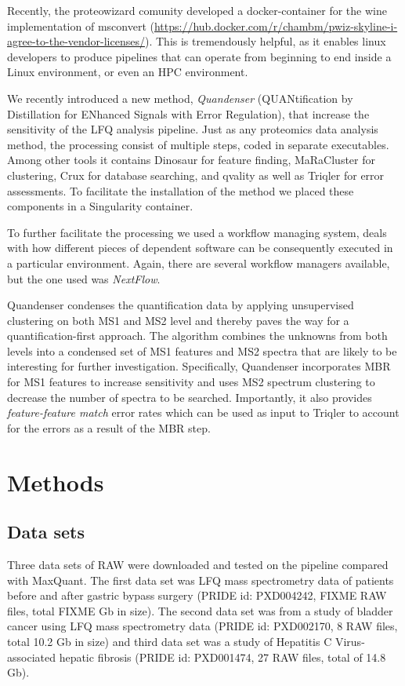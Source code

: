 \documentclass[11pt]{article}
\begin{document}
Recently, the proteowizard comunity developed a docker-container for the wine implementation of msconvert (\url{https://hub.docker.com/r/chambm/pwiz-skyline-i-agree-to-the-vendor-licenses/}). This is tremendously helpful, as it enables linux developers to produce pipelines that can operate from beginning to end inside a Linux environment, or even an HPC environment.

We recently introduced a new method, {\em Quandenser} (QUANtification by
Distillation for ENhanced Signals with Error Regulation), that increase the sensitivity of the LFQ
analysis pipeline. Just as any proteomics data analysis method, the processing consist of multiple steps, coded in separate executables. Among other tools it contains Dinosaur\cite{teleman2016dinosaur} for feature finding, MaRaCluster\cite{the2016maracluster} for clustering, Crux\cite{mcilwain2014} for database searching, and qvality\cite{kall2008non} as well as Triqler\cite{the2018integrated} for error assessments. To facilitate the installation of the method we placed these components in a Singularity container.

To further facilitate the processing we used a workflow managing system, deals with how different pieces of dependent software can be consequently executed in a particular environment. Again, there are several workflow managers available, but the one used was \textit{NextFlow}\cite{di2017nextflow}.

Quandenser condenses the quantification data by applying
unsupervised clustering on both MS1 and MS2 level and thereby paves the way for
a quantification-first approach. The algorithm combines the unknowns from both
levels into a condensed set of MS1 features and MS2 spectra that are likely to
be interesting for further investigation. Specifically, Quandenser incorporates
MBR for MS1 features to increase sensitivity and uses MS2 spectrum clustering
to decrease the number of spectra to be searched. Importantly, it also provides
{\em feature-feature match} error rates which can be used as input to Triqler
to account for the errors as a result of the MBR step.

\section*{Methods}

\subsection*{Data sets}
Three data sets of RAW were downloaded and tested on the pipeline compared with MaxQuant. The first data set was LFQ mass spectrometry data of patients before and after gastric bypass surgery (PRIDE id: PXD004242, FIXME RAW files, total FIXME Gb in size). The second data set was from a study of bladder cancer using LFQ mass spectrometry data (PRIDE id: PXD002170, 8 RAW files, total 10.2 Gb in size) and third data set was a study of Hepatitis C Virus-associated hepatic fibrosis (PRIDE id:  PXD001474, 27 RAW files, total of 14.8 Gb).
\end{document}
